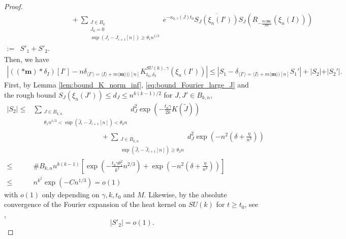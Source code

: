 \documentclass[10pt,11pt]{amsart}%
\begin{document}
\begin{proof}
\begin{align*}
&\hspace{3cm}+\sum_{\substack{J\in  B_{k}\\J_k=0\\ \sup(J_{i}-J_{i+1} [n])\geq \theta_1n^{1/3}}}e^{-\kappa_{0,\gamma}(J)t_0}\overline{S_{J}(\xi_{n}(I'))}S_{J}\left(R_{-\frac{m\langle\mathbf{m}\rangle}{kn}}\left(\xi_{n}\left(I\right)\right)\right)\\
:=&S'_1+S'_2.
\end{align*}
Then, we have 
\begin{align*}\left\vert \left(\left(\ast \mathbf{m}\right)\ast \delta_I\right)[I']- n\delta_{\langle I'\rangle=\langle I\rangle+m\langle\mathbf{m}\rangle)\rangle[n]}K^{SU(k),\gamma}_{t_0,\delta_I}(\xi_{n}(I'))\right\vert\leq \left\vert S_1-\delta_{\langle I'\rangle=\langle I\rangle+m\langle\mathbf{m}\rangle)[n]}S_1'\right\vert+\left\vert S_2\vert+\vert S_2'\right\vert.
\end{align*}
First, by Lemma \ref{lem:bound_K_norm_inf}, \eqref{eq:bound_Fourier_large_J} and the rough bound $S_{J}(\xi_{n}(J'))\leq d_J\leq n^{k(k-1)/2}$ for $J,J'\in B_{k,n}$,
\begin{align*}
\left\vert S_2\right\vert\leq& \sum_{\substack{J\in B_{k,n}\\ \theta_1 n^{1/3}<\sup(\hat{J}_{i}-\hat{J}_{i+1} [n])< \theta_2n}}d_{J}^2\exp\left(-\frac{t_0\gamma}{2k}K(\tilde{J})\right)\\
&\hspace{4cm}+ \sum_{\substack{J\in B_{k,n}\\ \sup(\hat{J}_{i}-\hat{J}_{i+1} [n])\geq \theta_2n}}d_{J}^2\exp\left(-n^2\left(\delta+ \frac{\eta}{n^3}\right)\right)\\
\leq &\#B_{k,n}n^{k(k-1)}\left[\exp\left(-\frac{t_0\gamma \theta_1^2}{k^2}n^{2/3}\right)+\exp\left(-n^2\left(\delta+ \frac{\eta}{n^3}\right)\right)\right]\\
\leq & n^{k^2}\exp\left(-Cn^{1/3}\right)=o\left(1\right)
\end{align*}
with $o\left(1\right)$ only depending on $\gamma, k, t_0$ and $M$. Likewise, by the absolute convergence of the Fourier expansion of the heat kernel on $SU(k)$ for $t\geq t_0$, see \cite{Far}, 
$$\left\vert S'_2\right\vert=o(1).$$


\end{proof}
\end{document}
